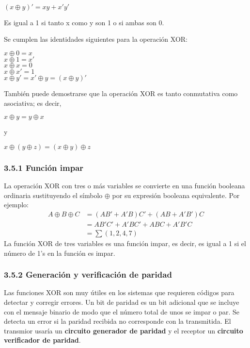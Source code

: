 \documentclass{article}
\begin{document}
\begin{center}
    $(x \oplus y)' = xy + x'y'$
\end{center}
Es igual a 1 si tanto x como y son 1 o si ambas son 0.

Se cumplen las identidades siguientes para la operaci\'{o}n XOR:
\begin{center}
    $x \oplus 0 = x$ \\
    $x \oplus 1 = x'$ \\
    $x \oplus x = 0$ \\
    $x \oplus x' = 1$ \\
    $x \oplus y' = x' \oplus y = (x \oplus y)' $
\end{center}

Tambi\'{e}n puede demostrarse que la operaci\'{o}n XOR es tanto conmutativa como asociativa; es decir,
\begin{center}
    $x \oplus y = y \oplus x$ \\
    \begin{flushleft}
        y
    \end{flushleft}
    $x \oplus (y \oplus z) = (x \oplus y) \oplus z$
\end{center}

\subsubsection*{3.5.1 Funci\'{o}n impar}
La operaci\'{o}n XOR con tres o m\'{a}s variables se convierte en una funci\'{o}n booleana ordinaria sustituyendo
el s\'{i}mbolo $\oplus$ por su expresi\'{o}n booleana equivalente. Por ejemplo:
\begin{align*}
    A \oplus B \oplus C &= (AB' + A'B)C' + (AB + A'B')C \\
    &= AB'C' + A'BC' + ABC + A'B'C \\
    &= \sum (1, 2, 4, 7)
\end{align*}
La funci\'{o}n XOR de tres variables es una funci\'{o}n impar, es decir, es igual a 1 si el n\'{u}mero de 1's en la
funci\'{o}n es impar.

\subsubsection*{3.5.2 Generaci\'{o}n y verificaci\'{o}n de paridad}
Las funciones XOR son muy \'{u}tiles en los sistemas que requieren c\'{o}digos para detectar y corregir errores. Un bit
de paridad es un bit adicional que se incluye con el mensaje binario de modo que el n\'{u}mero total de unos se impar o
par. Se detecta un error si la paridad recibida no corresponde con la transmitida. El transmior usar\'{i}a un \textbf{circuito
generador de paridad} y el receptor un \textbf{circuito verificador de paridad}.
\end{document}
